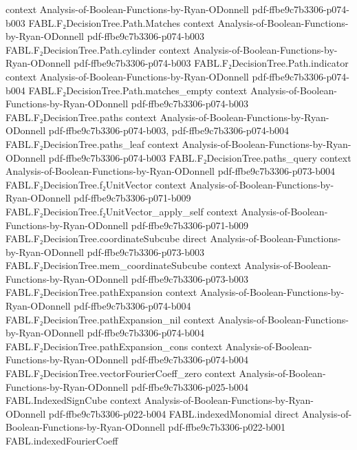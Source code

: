 \begin{theorem}
  {context}
  {Analysis-of-Boolean-Functions-by-Ryan-ODonnell}
  {pdf-ffbe9c7b3306-p074-b003}
\proofstep
  {FABL.F₂DecisionTree.Path.Matches}
  {context}
  {Analysis-of-Boolean-Functions-by-Ryan-ODonnell}
  {pdf-ffbe9c7b3306-p074-b003}
\proofstep
  {FABL.F₂DecisionTree.Path.cylinder}
  {context}
  {Analysis-of-Boolean-Functions-by-Ryan-ODonnell}
  {pdf-ffbe9c7b3306-p074-b003}
\proofstep
  {FABL.F₂DecisionTree.Path.indicator}
  {context}
  {Analysis-of-Boolean-Functions-by-Ryan-ODonnell}
  {pdf-ffbe9c7b3306-p074-b004}
\proofstep
  {FABL.F₂DecisionTree.Path.matches_empty}
  {context}
  {Analysis-of-Boolean-Functions-by-Ryan-ODonnell}
  {pdf-ffbe9c7b3306-p074-b003}
\proofstep
  {FABL.F₂DecisionTree.paths}
  {context}
  {Analysis-of-Boolean-Functions-by-Ryan-ODonnell}
  {pdf-ffbe9c7b3306-p074-b003,
    pdf-ffbe9c7b3306-p074-b004}
\proofstep
  {FABL.F₂DecisionTree.paths_leaf}
  {context}
  {Analysis-of-Boolean-Functions-by-Ryan-ODonnell}
  {pdf-ffbe9c7b3306-p074-b003}
\proofstep
  {FABL.F₂DecisionTree.paths_query}
  {context}
  {Analysis-of-Boolean-Functions-by-Ryan-ODonnell}
  {pdf-ffbe9c7b3306-p073-b004}
\proofstep
  {FABL.F₂DecisionTree.f₂UnitVector}
  {context}
  {Analysis-of-Boolean-Functions-by-Ryan-ODonnell}
  {pdf-ffbe9c7b3306-p071-b009}
\proofstep
  {FABL.F₂DecisionTree.f₂UnitVector_apply_self}
  {context}
  {Analysis-of-Boolean-Functions-by-Ryan-ODonnell}
  {pdf-ffbe9c7b3306-p071-b009}
\proofstep
  {FABL.F₂DecisionTree.coordinateSubcube}
  {direct}
  {Analysis-of-Boolean-Functions-by-Ryan-ODonnell}
  {pdf-ffbe9c7b3306-p073-b003}
\proofstep
  {FABL.F₂DecisionTree.mem_coordinateSubcube}
  {context}
  {Analysis-of-Boolean-Functions-by-Ryan-ODonnell}
  {pdf-ffbe9c7b3306-p073-b003}
\proofstep
  {FABL.F₂DecisionTree.pathExpansion}
  {context}
  {Analysis-of-Boolean-Functions-by-Ryan-ODonnell}
  {pdf-ffbe9c7b3306-p074-b004}
\proofstep
  {FABL.F₂DecisionTree.pathExpansion_nil}
  {context}
  {Analysis-of-Boolean-Functions-by-Ryan-ODonnell}
  {pdf-ffbe9c7b3306-p074-b004}
\proofstep
  {FABL.F₂DecisionTree.pathExpansion_cons}
  {context}
  {Analysis-of-Boolean-Functions-by-Ryan-ODonnell}
  {pdf-ffbe9c7b3306-p074-b004}
\proofstep
  {FABL.F₂DecisionTree.vectorFourierCoeff_zero}
  {context}
  {Analysis-of-Boolean-Functions-by-Ryan-ODonnell}
  {pdf-ffbe9c7b3306-p025-b004}
\proofstep
  {FABL.IndexedSignCube}
  {context}
  {Analysis-of-Boolean-Functions-by-Ryan-ODonnell}
  {pdf-ffbe9c7b3306-p022-b004}
\proofstep
  {FABL.indexedMonomial}
  {direct}
  {Analysis-of-Boolean-Functions-by-Ryan-ODonnell}
  {pdf-ffbe9c7b3306-p022-b001}
\proofstep
  {FABL.indexedFourierCoeff}

\end{theorem}
